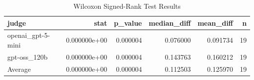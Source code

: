 \begin{table}
\caption{Wilcoxon Signed-Rank Test Results}
\label{tab:wilcoxon}
\begin{tabular}{lrrrrr}
\toprule
judge & stat & p_value & median_diff & mean_diff & n \\
\midrule
openai_gpt-5-mini & 0.000000e+00 & 0.000004 & 0.076000 & 0.091734 & 19 \\
gpt-oss_120b & 0.000000e+00 & 0.000004 & 0.143763 & 0.160212 & 19 \\
Average & 0.000000e+00 & 0.000004 & 0.112503 & 0.125970 & 19 \\
\bottomrule
\end{tabular}
\end{table}
